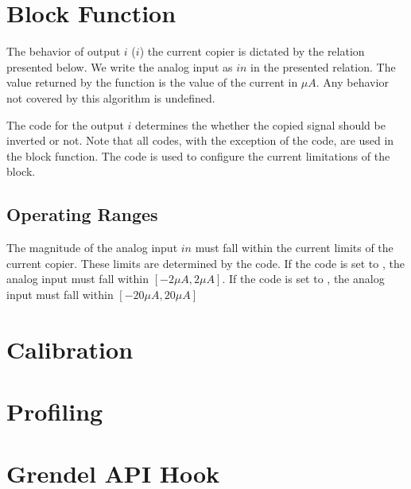   
\section{Block Function}\label{fanout:blockfun}
The behavior of output $i$ ($i$) the current copier is dictated by the
relation presented below. We write the analog input as $in$ in the presented
relation. The value returned by the function is the value of the current in $\mu
A$. Any behavior not covered by this algorithm is undefined.

\begin{algorithmic}
  \EndIf
\end{algorithmic}

The  code for the output $i$ determines the whether the copied signal
should be inverted or not. Note that all \static codes, with the exception of
the  code, are used in the block function. The  code is
used to configure the current limitations of the block.

\subsection{Operating Ranges}

The magnitude of the analog input $in$ must fall within the current limits of
the current copier. These limits are determined by the  code. If the
 code is set to , the analog input must fall within
$[-2 \mu A, 2 \mu A]$. If the  code is set to , the
analog input must fall within $[-20 \mu A, 20 \mu A]$

\section{Calibration}\label{fanout:calib}


\begin{algorithmic}
    \EndFor
    \EndFor
    \EndFor
    \EndFor
\end{algorithmic}

\section{Profiling}\label{fanout:calib}


\section{Grendel API Hook}